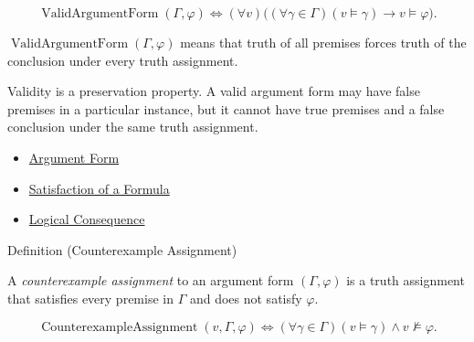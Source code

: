 \begin{remark*}
\[
\operatorname{ValidArgumentForm}(\Gamma,\varphi)
\Longleftrightarrow
(\forall v)\bigl((\forall\gamma\in\Gamma)(v\models\gamma)
\to v\models\varphi\bigr).
\]
\end{remark*}

\begin{remark*}
\(\operatorname{ValidArgumentForm}(\Gamma,\varphi)\) means that truth of all
premises forces truth of the conclusion under every truth assignment.
\end{remark*}

\begin{remark*}[Interpretation]
Validity is a preservation property. A valid argument form may have false
premises in a particular instance, but it cannot have true premises and a false
conclusion under the same truth assignment.
\end{remark*}

\begin{dependencies}
\begin{itemize}
  \item \hyperref[def:argument-form-propositional-logic]{Argument Form}
  \item \hyperref[def:satisfaction-propositional-formula]{Satisfaction of a Formula}
  \item \hyperref[def:logical-consequence-propositional-logic]{Logical Consequence}
\end{itemize}
\end{dependencies}

\begin{definitionbox}{Definition (Counterexample Assignment)}
\begin{definition}
\label{def:counterexample-assignment-propositional-logic}
A \emph{counterexample assignment} to an argument form \((\Gamma,\varphi)\) is a
truth assignment that satisfies every premise in \(\Gamma\) and does not satisfy
\(\varphi\).
\end{definition}
\end{definitionbox}

\begin{remark*}
\[
\operatorname{CounterexampleAssignment}(v,\Gamma,\varphi)
\Longleftrightarrow
(\forall\gamma\in\Gamma)(v\models\gamma)\land v\not\models\varphi.
\]
\end{remark*}

